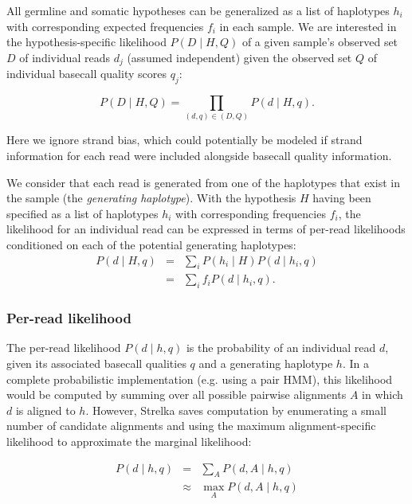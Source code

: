 \documentclass{article}
\begin{document}
All germline and somatic hypotheses can be generalized as a list of haplotypes $h_i$ with corresponding expected frequencies $f_i$ in each sample. We are interested in the hypothesis-specific likelihood $P(D \mid H,Q)$ of a given sample’s observed set $D$ of individual reads $d_j$ (assumed independent) given the observed set $Q$ of individual basecall quality scores $q_j$:

\begin{equation*}
\label{eq:geno_lik}
P(D \mid H,Q) = \prod_{(d,q) \in (D,Q)} P(d \mid H,q).
\end{equation*}

Here we ignore strand bias, which could potentially be modeled if strand information for each read were included alongside basecall quality information.

We consider that each read is generated from one of the haplotypes that exist in the sample (the \emph{generating haplotype}). With the hypothesis $H$ having been specified as a list of haplotypes $h_i$ with corresponding frequencies $f_i$, the likelihood for an individual read can be expressed in terms of per-read likelihoods conditioned on each of the potential generating haplotypes:
\begin{eqnarray*}
P(d \mid H,q) & = & \sum_i P(h_i \mid H)P(d \mid h_i,q)\\
& = & \sum_i f_i P(d \mid h_i,q).
\end{eqnarray*}

\subsubsection{Per-read likelihood}
\label{sec:PerReadLikelihood}

The per-read likelihood $P(d \mid h,q)$ is the probability of an individual read $d$, given its associated basecall qualities $q$ and a generating haplotype $h$. In a complete probabilistic implementation (e.g. using a pair HMM), this likelihood would be computed by summing over all possible pairwise alignments $A$ in which $d$ is aligned to $h$. However, Strelka saves computation by enumerating a small number of candidate alignments and using the maximum alignment-specific likelihood to approximate the marginal likelihood:

\begin{eqnarray*}
\label{eq:read_lik}
P(d \mid h,q) & = & \sum_A P(d,A \mid h,q)\\
& \approx & \max_A P(d,A \mid h,q)
\end{eqnarray*}
\end{document}
